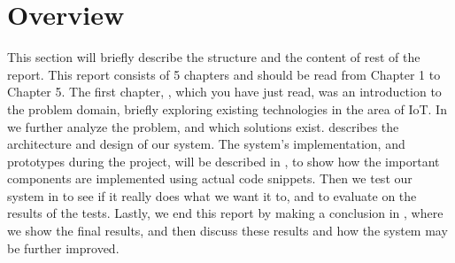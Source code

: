 \section{Overview}\label{sec:overview}
This section will briefly describe the structure and the content of rest of the report. 
This report consists of 5 chapters and should be read from Chapter 1 to Chapter 5. 
The first chapter, , which you have just read, 
was an introduction to the problem domain, 
briefly exploring existing technologies in the area of IoT. 
In  we further analyze the problem, 
and which solutions exist.
 describes the architecture and design of our system. 
The system's implementation, and prototypes during the project, 
will be described in , 
to show how the important components are implemented using actual code snippets. 
Then we test our system in  to see if it really does what we want it to, 
and to evaluate on the results of the tests. 
Lastly, we end this report by making a conclusion in , 
where we show the final results, 
and then discuss these results and how the system may be further improved. 
